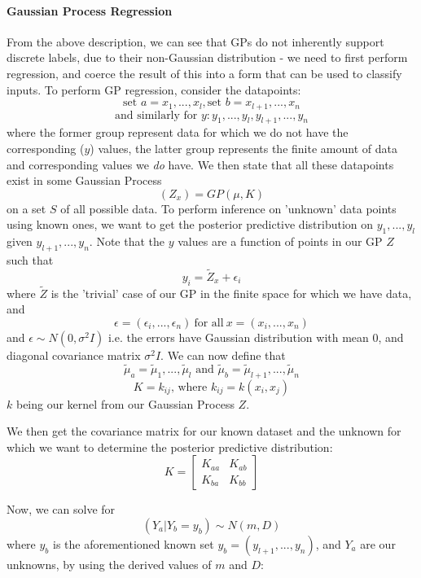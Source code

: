 \documentclass[10pt,sts]{article}
\begin{document}
\begin{multicols}{2}
    \paragraph{Gaussian Process Regression} From the above description, we can see that GPs do not inherently support discrete labels, due to their non-Gaussian distribution - we need to first perform regression, and coerce the result of this into a form that can be used to classify inputs. To perform GP regression, consider the datapoints:
    $$ \textrm{set } a = x_1, ... , x_l, \textrm{set } b = x_{l+1}, ... , x_n $$
    $$ \textrm{and similarly for } y: y_1, ... , y_l, y_{l+1}, ... , y_n $$
    where the former group represent data for which we do not have the corresponding ($y$) values, the latter group represents the finite amount of data and corresponding values we \textit{do} have. We then state that all these datapoints exist in some Gaussian Process $$ (Z_x) = GP(\mu, K) $$ on a set $S$ of all possible data. To perform inference on 'unknown' data points using known ones, we want to get the posterior predictive distribution on $y_1, ... , y_l$ given $y_{l+1}, ... , y_n$. Note that the $y$ values are a function of points in our GP $Z$ such that $$y_i = \widetilde{Z}_x + \epsilon_i$$ where $\widetilde{Z}$ is the 'trivial' case of our GP in the finite space for which we have data, and $$\epsilon = (\epsilon_i, ... , \epsilon_n) \ \textrm{for all} \ x = (x_i, ... , x_n)$$ and $\epsilon \sim N(0, \sigma^2I)$ i.e. the errors have Gaussian distribution with mean 0, and diagonal covariance matrix $\sigma^2I$. We can now define that $$\widetilde{\mu}_{a} = \widetilde{\mu}_{1} ,..., \widetilde{\mu}_{l} \textrm{ and } \widetilde{\mu}_{b} = \widetilde{\mu}_{l+1} ,..., \widetilde{\mu}_{n}$$ 
    $$ K = k_{ij} \textrm{, where } k_{ij} = k(x_i, x_j) $$
    $k$ being our kernel from our Gaussian Process $Z$. 

    We then get the covariance matrix for our known dataset and the unknown for which we want to determine the posterior predictive distribution:
    $$ K = 
    \begin{bmatrix}
        K_{aa} & K_{ab} \\
        K_{ba} & K_{bb} 
    \end{bmatrix}
    $$

    \pagebreak
    Now, we can solve for $$(Y_a | Y_b = y_b) \sim N(m, D)$$
    where $y_b$ is the aforementioned known set $y_b = (y_{l+1}, ... , y_{n})$, and $Y_a$ are our unknowns, by using the derived values of $m$ and $D$:


\end{multicols}
\end{document}
